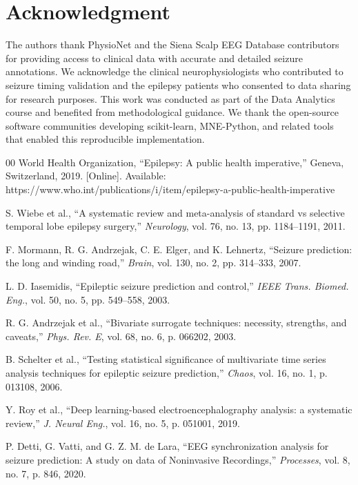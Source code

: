 \documentclass[conference]{IEEEtran}
\begin{document}
\section*{Acknowledgment}
The authors thank PhysioNet and the Siena Scalp EEG Database contributors for providing access to clinical data with accurate and detailed seizure annotations. We acknowledge the clinical neurophysiologists who contributed to seizure timing validation and the epilepsy patients who consented to data sharing for research purposes. This work was conducted as part of the Data Analytics course and benefited from methodological guidance. We thank the open-source software communities developing scikit-learn, MNE-Python, and related tools that enabled this reproducible implementation.

\begin{thebibliography}{00}
 World Health Organization, ``Epilepsy: A public health imperative,'' Geneva, Switzerland, 2019. [Online]. Available: https://www.who.int/publications/i/item/epilepsy-a-public-health-imperative

 S. Wiebe et al., ``A systematic review and meta-analysis of standard vs selective temporal lobe epilepsy surgery,'' \textit{Neurology}, vol. 76, no. 13, pp. 1184--1191, 2011.

 F. Mormann, R. G. Andrzejak, C. E. Elger, and K. Lehnertz, ``Seizure prediction: the long and winding road,'' \textit{Brain}, vol. 130, no. 2, pp. 314--333, 2007.

 L. D. Iasemidis, ``Epileptic seizure prediction and control,'' \textit{IEEE Trans. Biomed. Eng.}, vol. 50, no. 5, pp. 549--558, 2003.

 R. G. Andrzejak et al., ``Bivariate surrogate techniques: necessity, strengths, and caveats,'' \textit{Phys. Rev. E}, vol. 68, no. 6, p. 066202, 2003.

 B. Schelter et al., ``Testing statistical significance of multivariate time series analysis techniques for epileptic seizure prediction,'' \textit{Chaos}, vol. 16, no. 1, p. 013108, 2006.

 Y. Roy et al., ``Deep learning-based electroencephalography analysis: a systematic review,'' \textit{J. Neural Eng.}, vol. 16, no. 5, p. 051001, 2019.

 P. Detti, G. Vatti, and G. Z. M. de Lara, ``EEG synchronization analysis for seizure prediction: A study on data of Noninvasive Recordings,'' \textit{Processes}, vol. 8, no. 7, p. 846, 2020.


\end{thebibliography}
\end{document}
